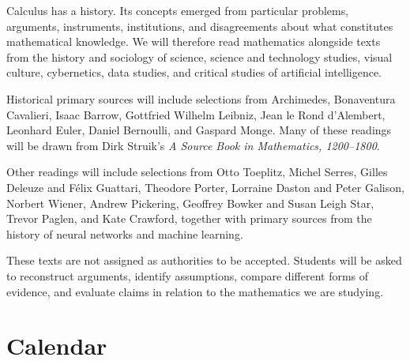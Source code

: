 \documentclass[11pt]{article}
\begin{document}
Calculus has a history. Its concepts emerged from particular problems,
arguments, instruments, institutions, and disagreements about what
constitutes mathematical knowledge. We will therefore read mathematics
alongside texts from the history and sociology of science, science and
technology studies, visual culture, cybernetics, data studies, and
critical studies of artificial intelligence.

Historical primary sources will include selections from Archimedes,
Bonaventura Cavalieri, Isaac Barrow, Gottfried Wilhelm Leibniz,
Jean le Rond d'Alembert, Leonhard Euler, Daniel Bernoulli, and
Gaspard Monge. Many of these readings will be drawn from Dirk
Struik's \emph{A Source Book in Mathematics, 1200--1800}.

Other readings will include selections from Otto Toeplitz,
Michel Serres, Gilles Deleuze and F\'elix Guattari, Theodore Porter,
Lorraine Daston and Peter Galison, Norbert Wiener, Andrew Pickering,
Geoffrey Bowker and Susan Leigh Star, Trevor Paglen, and Kate Crawford,
together with primary sources from the history of neural networks and
machine learning.

These texts are not assigned as authorities to be accepted. Students
will be asked to reconstruct arguments, identify assumptions, compare
different forms of evidence, and evaluate claims in relation to the
mathematics we are studying.


\section{Calendar}

\small
\end{document}
